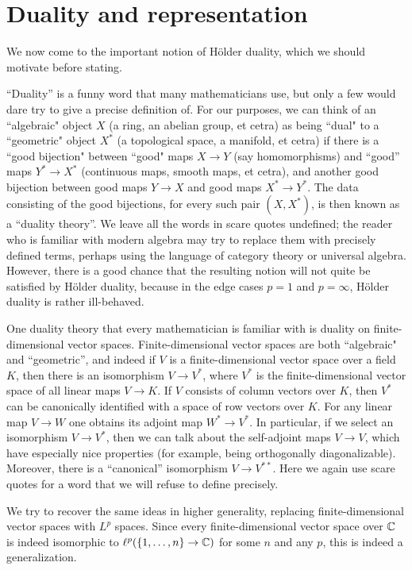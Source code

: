 \section{Duality and representation}
We now come to the important notion of H\"older duality, which we should motivate before stating.

``Duality'' is a funny word that many mathematicians use, but only a few would dare try to give a precise definition of.
For our purposes, we can think of an ``algebraic" object $X$ (a ring, an abelian group, et cetra) as being ``dual" to a ``geometric" object $X^*$ (a topological space, a manifold, et cetra) if there is a ``good bijection" between ``good" maps $X \to Y$ (say homomorphisms) and ``good'' maps $Y^* \to X^*$ (continuous maps, smooth maps, et cetra), and another good bijection between good maps $Y \to X$ and good maps $X^* \to Y^*$.
The data consisting of the good bijections, for every such pair $(X, X^*)$, is then known as a ``duality theory''.
We leave all the words in scare quotes undefined; the reader who is familiar with modern algebra may try to replace them with precisely defined terms, perhaps using the language of category theory or universal algebra.
However, there is a good chance that the resulting notion will not quite be satisfied by H\"older duality, because in the edge cases $p = 1$ and $p = \infty$, H\"older duality is rather ill-behaved.

One duality theory that every mathematician is familiar with is duality on finite-dimensional vector spaces.
Finite-dimensional vector spaces are both ``algebraic" and ``geometric'', and indeed if $V$ is a finite-dimensional vector space over a field $K$, then there is an isomorphism $V \to V^*$, where $V^*$ is the finite-dimensional vector space of all linear maps $V \to K$.
If $V$ consists of column vectors over $K$, then $V^*$ can be canonically identified with a space of row vectors over $K$.
For any linear map $V \to W$ one obtains its adjoint map $W^* \to V^*$.
In particular, if we select an isomorphism $V \to V^*$, then we can talk about the self-adjoint maps $V \to V$, which have especially nice properties (for example, being orthogonally diagonalizable).
Moreover, there is a ``canonical'' isomorphism $V \to V^{**}$.
Here we again use scare quotes for a word that we will refuse to define precisely.

We try to recover the same ideas in higher generality, replacing finite-dimensional vector spaces with $L^p$ spaces.
Since every finite-dimensional vector space over $\mathbb{C}$ is indeed isomorphic to $\ell^p(\{1, \dots, n\} \to \mathbb{C})$ for some $n$ and any $p$, this is indeed a generalization.


